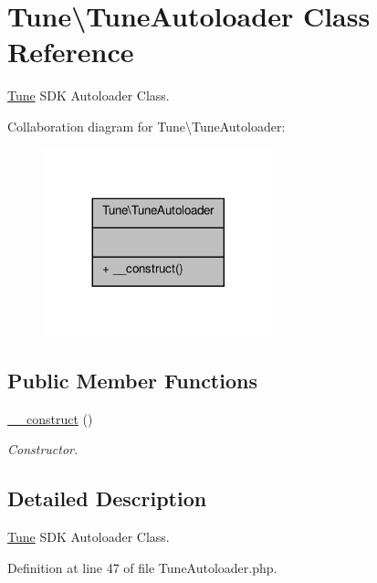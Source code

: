 \hypertarget{classTune_1_1TuneAutoloader}{\section{Tune\textbackslash{}Tune\-Autoloader Class Reference}
\label{classTune_1_1TuneAutoloader}
}


\hyperlink{namespaceTune}{Tune} S\-D\-K Autoloader Class.  




Collaboration diagram for Tune\textbackslash{}Tune\-Autoloader\-:
\nopagebreak
\begin{figure}[H]
\begin{center}
\leavevmode
\includegraphics[width=188pt]{classTune_1_1TuneAutoloader__coll__graph}
\end{center}
\end{figure}
\subsection*{Public Member Functions}
\begin{DoxyCompactItemize}
\item 
\hyperlink{classTune_1_1TuneAutoloader_ac5c45726c43d381e2972209924591a27}{\-\_\-\-\_\-construct} ()
\begin{DoxyCompactList}\small\item\em Constructor. \end{DoxyCompactList}\end{DoxyCompactItemize}


\subsection{Detailed Description}
\hyperlink{namespaceTune}{Tune} S\-D\-K Autoloader Class. 



Definition at line 47 of file Tune\-Autoloader.\-php.




